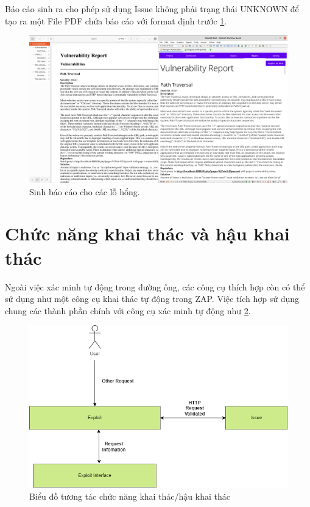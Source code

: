 \documentclass[./../main.tex]{subfiles}
\begin{document}
Báo cáo sinh ra cho phép sử dụng Issue không phải trạng thái
UNKNOWN để tạo ra một File PDF chứa báo cáo với format định trước \ref{fig:report}.

\begin{figure}[ht!]
	\includegraphics[width=\linewidth]{./images/report.png}
	\caption{Sinh báo cáo cho các lỗ hổng.}
	\label{fig:report}
\end{figure}

\section{Chức năng khai thác và hậu khai thác}

Ngoài việc xác minh tự động trong đường ống, các công cụ thích
hợp còn có thể sử dụng như một công cụ khai thác tự động trong ZAP.
Việc tích hợp sử dụng chung các thành phần chính với công cụ xác minh
tự động như \ref{fig:exploit}.

\begin{figure}[ht!]
	\includegraphics[width=\linewidth]{./images/exploit.png}
	\caption{Biểu đồ tương tác chức năng khai thác/hậu khai thác}
	\label{fig:exploit}
\end{figure}
\end{document}
